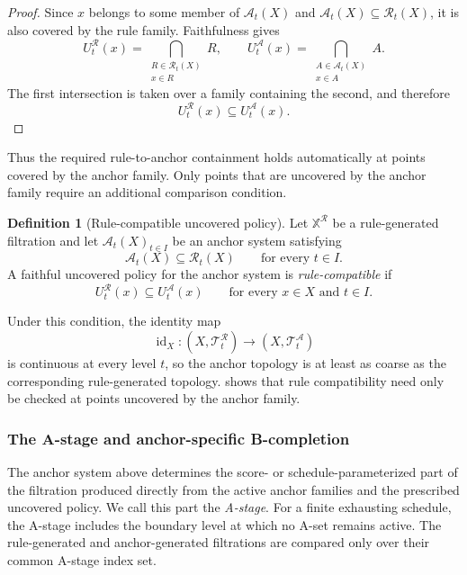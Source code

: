 \documentclass[a4paper,11pt]{article}
\theoremstyle{definition}
\newtheorem{definition}[definition]{Definition}
\theoremstyle{remark}
\DeclareMathOperator{\id}{id}
\begin{document}
\begin{proof}
Since $x$ belongs to some member of $\mathcal A_t(X)$ and $\mathcal A_t(X)\subseteq\mathcal R_t(X)$, it is also covered by the rule family. Faithfulness gives
$$
U_t^{\mathcal R}(x) = \bigcap_{\substack{R\in\mathcal R_t(X)\\x\in R}}R, \qquad U_t^{\mathcal A}(x) = \bigcap_{\substack{A\in\mathcal A_t(X)\\x\in A}}A.
$$
The first intersection is taken over a family containing the second, and therefore
$$
U_t^{\mathcal R}(x)\subseteq U_t^{\mathcal A}(x).
$$
\end{proof}

Thus the required rule-to-anchor containment holds automatically at points covered by the anchor family. Only points that are uncovered by the anchor family require an additional comparison condition.

\begin{definition}[Rule-compatible uncovered policy]
Let $\mathbb X^{\mathcal R}$ be a rule-generated filtration and let ${\mathcal A_t(X)}_{t\in I}$ be an anchor system satisfying
$$
\mathcal A_t(X)\subseteq\mathcal R_t(X)\qquad\text{for every }t\in I.
$$
A faithful uncovered policy for the anchor system is \emph{rule-compatible} if
$$
U_t^{\mathcal R}(x)\subseteq U_t^{\mathcal A}(x)\qquad \text{for every }x\in X\text{ and }t\in I.
$$
\end{definition}

Under this condition, the identity map
$$
\id_X\colon (X,\mathcal T_t^{\mathcal R})\longrightarrow (X,\mathcal T_t^{\mathcal A})
$$
is continuous at every level $t$, so the anchor topology is at least as coarse as the corresponding rule-generated topology.  shows that rule compatibility need only be checked at points uncovered by the anchor family.

\subsubsection*{The A-stage and anchor-specific B-completion}

The anchor system above determines the score- or schedule-parameterized part of the filtration produced directly from the active anchor families and the prescribed uncovered policy. We call this part the \emph{A-stage}. For a finite exhausting schedule, the A-stage includes the boundary level at which no A-set remains active. The rule-generated and anchor-generated filtrations are compared only over their common A-stage index set.
\end{document}
